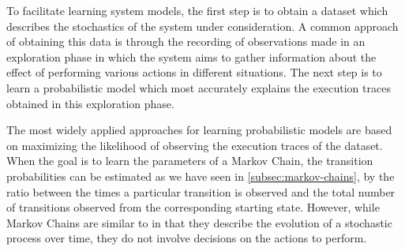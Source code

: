 To facilitate learning system models, the first step is to obtain a dataset which describes the stochastics of the system under consideration.
A common approach of obtaining this data is through the recording of observations made in an exploration phase in which the system aims to gather information about the effect of performing various actions in different situations.
The next step is to learn a probabilistic model which most accurately explains the execution traces obtained in this exploration phase.

The most widely applied approaches for learning probabilistic models are based on maximizing the likelihood of observing the execution traces of the dataset.
When the goal is to learn the parameters of a Markov Chain, the transition probabilities can be estimated as we have seen in \autoref{subsec:markov-chains}, by the ratio between the times a particular transition is observed and the total number of transitions observed from the corresponding starting state.
However, while Markov Chains are similar to  in that they describe the evolution of a stochastic process over time, they do not involve decisions on the actions to perform.


